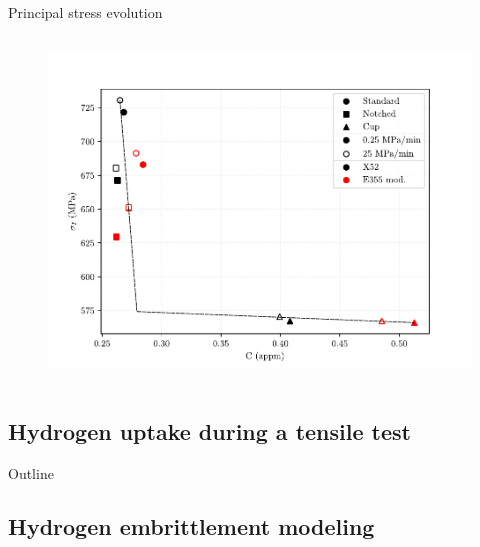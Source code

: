 \documentclass[9pt]{beamer}
\begin{document}
\begin{frame}{Principal stress evolution}
\begin{columns}
\begin{column}{0.49\textwidth}
	\begin{figure}
		\centering
		\includegraphics[width=\textwidth]{Images/plot_sigp1_C_edit.pdf} \\
	\end{figure}
\end{column}

\end{columns}

\end{frame}


\subsection{Hydrogen uptake during a tensile test}

\begin{frame}{Outline}
	\tableofcontents[ 
    currentsubsection, 
    hideothersubsections, 
    sectionstyle=show/shaded, 
    subsectionstyle=show/shaded, 
    ] 
\end{frame}


\subsection{Hydrogen embrittlement modeling}

\end{document}
